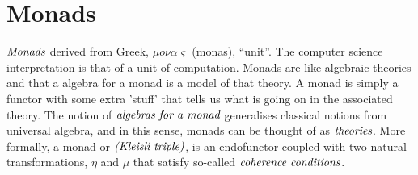 \documentclass[10pt, oneside, reqno]{amsart}
\theoremstyle{plain}%
\theoremstyle{definition}
\newtheorem{defn}[thm]{Definition}
\newtheorem{exmp}[thm]{Example}
\theoremstyle{remark}
\begin{document}
% 


\section{Monads} %
\label{sec:monads}
$\emph{Monads}$ derived from Greek, $\mu o \nu\alpha\varsigma$ (monas), ``unit''.
The computer science interpretation is that of a unit of computation.
Monads are like algebraic theories and that a algebra for a monad is a model of that theory. A monad is simply a functor
with some extra 'stuff' that tells us what is going on in the associated theory.
The notion of $\emph{algebras for a monad}$ generalises classical notions from universal algebra,
and in this sense, monads can be thought of as $\emph{theories}$.
More formally, a monad or $\emph{(Kleisli triple)}$, is an endofunctor coupled with two natural transformations,
$\eta$ and $\mu$ that satisfy so-called $\emph{coherence conditions}$.
\end{document}

